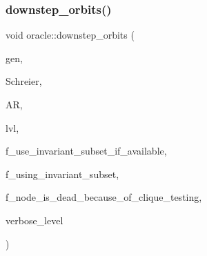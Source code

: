\subsubsection{\texorpdfstring{downstep\+\_\+orbits()}{downstep\_orbits()}}
{\footnotesize\ttfamily void oracle\+::downstep\+\_\+orbits (\begin{DoxyParamCaption}\item[{\mbox{\hyperlink{classgenerator}{generator}} $\ast$}]{gen,  }\item[{\mbox{\hyperlink{classschreier}{schreier}} \&}]{Schreier,  }\item[{\mbox{\hyperlink{classaction}{action}} \&}]{AR,  }\item[{\mbox{\hyperlink{galois_8h_a09fddde158a3a20bd2dcadb609de11dc}{I\+NT}}}]{lvl,  }\item[{\mbox{\hyperlink{galois_8h_a09fddde158a3a20bd2dcadb609de11dc}{I\+NT}}}]{f\+\_\+use\+\_\+invariant\+\_\+subset\+\_\+if\+\_\+available,  }\item[{\mbox{\hyperlink{galois_8h_a09fddde158a3a20bd2dcadb609de11dc}{I\+NT}} \&}]{f\+\_\+using\+\_\+invariant\+\_\+subset,  }\item[{\mbox{\hyperlink{galois_8h_a09fddde158a3a20bd2dcadb609de11dc}{I\+NT}} \&}]{f\+\_\+node\+\_\+is\+\_\+dead\+\_\+because\+\_\+of\+\_\+clique\+\_\+testing,  }\item[{\mbox{\hyperlink{galois_8h_a09fddde158a3a20bd2dcadb609de11dc}{I\+NT}}}]{verbose\+\_\+level }\end{DoxyParamCaption})}

\mbox{\label{classoracle_a7c267cd92618aacf63d6fb3d8730df33}} 
